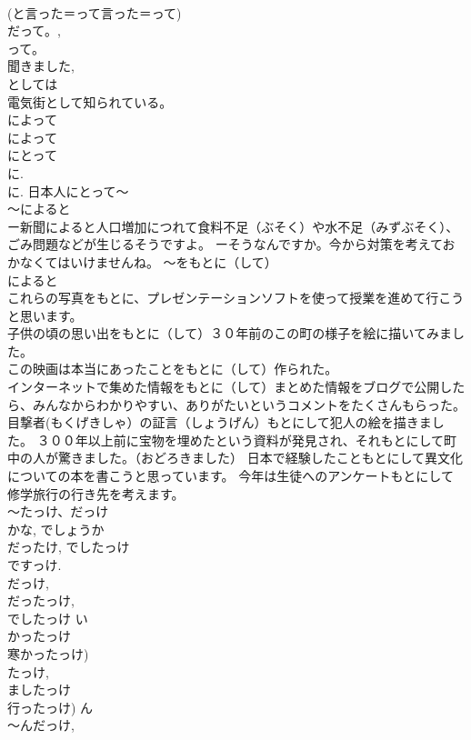 \documentclass[8pt]{extreport}
\begin{document}
\begin{CJK}{UTF8}{min}
\\	(と言った＝って言った＝って) 
\\	だって。, 
\\	って。 
\\	聞きました, 
\\	としては	
\\	電気街として知られている。　
\\	によって 
\\	によって
\\	にとって 
\\	に. 
\\	に. 日本人にとって～　　
\\	～によると 
\\	ー新聞によると人口増加につれて食料不足（ぶそく）や水不足（みずぶそく）、ごみ問題などが生じるそうですよ。 ーそうなんですか。今から対策を考えておかなくてはいけませんね。 ～をもとに（して） 
\\	によると 
\\	これらの写真をもとに、プレゼンテーションソフトを使って授業を進めて行こうと思います。 
\\	子供の頃の思い出をもとに（して）３０年前のこの町の様子を絵に描いてみました。 
\\	この映画は本当にあったことをもとに（して）作られた。 
\\	インターネットで集めた情報をもとに（して）まとめた情報をブログで公開したら、みんなからわかりやすい、ありがたいというコメントをたくさんもらった。 
\\	目撃者(もくげきしゃ）の証言（しょうげん）もとにして犯人の絵を描きました。 ３００年以上前に宝物を埋めたという資料が発見され、それもとにして町中の人が驚きました。（おどろきました） 日本で経験したこともとにして異文化についての本を書こうと思っています。 今年は生徒へのアンケートもとにして修学旅行の行き先を考えます。
\\	～たっけ、だっけ	
\\	かな, でしょうか 
\\	だったけ, でしたっけ 
\\	ですっけ. 
\\	だっけ, 
\\	だったっけ, 
\\	でしたっけ い
\\	かったっけ　
\\	寒かったっけ) 
\\	たっけ, 
\\	ましたっけ　　
\\	行ったっけ) ん 
\\	～んだっけ, 

\end{CJK}
\end{document}
